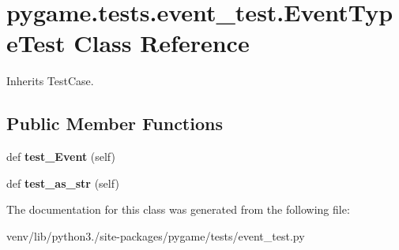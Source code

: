 \hypertarget{classpygame_1_1tests_1_1event__test_1_1_event_type_test}{}\section{pygame.\+tests.\+event\+\_\+test.\+Event\+Type\+Test Class Reference}
\label{classpygame_1_1tests_1_1event__test_1_1_event_type_test}


Inherits Test\+Case.

\subsection*{Public Member Functions}
\begin{DoxyCompactItemize}
\item 
\mbox{\label{classpygame_1_1tests_1_1event__test_1_1_event_type_test_a3f8e46d352c72239260d7e0e0a201dc6}} 
def {\bfseries test\+\_\+\+Event} (self)
\item 
\mbox{\label{classpygame_1_1tests_1_1event__test_1_1_event_type_test_a4665d13a9dbec8b9fd26b49413d55871}} 
def {\bfseries test\+\_\+as\+\_\+str} (self)
\end{DoxyCompactItemize}


The documentation for this class was generated from the following file\+:\begin{DoxyCompactItemize}
\item 
venv/lib/python3./site-\/packages/pygame/tests/event\+\_\+test.\+py\end{DoxyCompactItemize}
